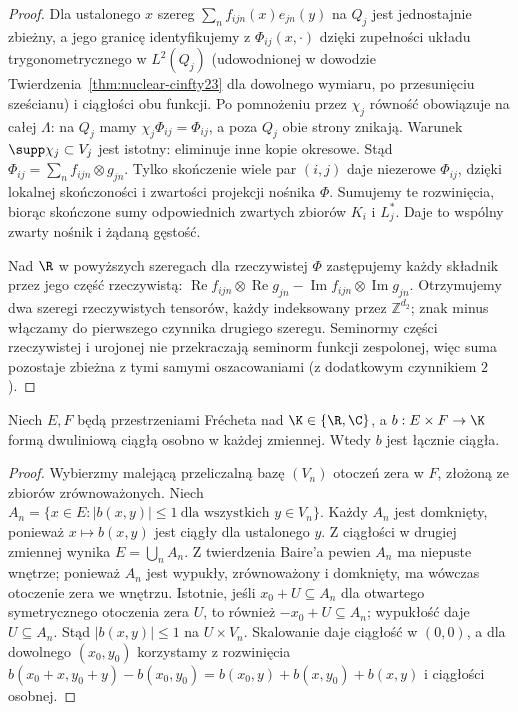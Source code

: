 \begin{proof}
Dla ustalonego $x$ szereg $\sum_n f_{ijn}(x)e_{jn}(y)$
na $Q_j$ jest jednostajnie zbieżny, a jego granicę
identyfikujemy z $\Phi_{ij}(x,\cdot)$ dzięki
zupełności układu trygonometrycznego w $L^2(Q_j)$
(udowodnionej w dowodzie Twierdzenia~\ref{thm:nuclear-cinfty23}
dla dowolnego wymiaru, po przesunięciu sześcianu)
i ciągłości obu funkcji. Po pomnożeniu przez $\chi_j$
równość obowiązuje na całej $\Lambda$: na $Q_j$
mamy $\chi_j\Phi_{ij}=\Phi_{ij}$, a poza $Q_j$
obie strony znikają. Warunek $\supp\chi_j\subset V_j$
jest istotny: eliminuje inne kopie okresowe.
Stąd $\Phi_{ij}=\sum_n f_{ijn}\otimes g_{jn}$.
Tylko skończenie wiele par $(i,j)$ daje niezerowe
$\Phi_{ij}$, dzięki lokalnej skończoności i zwartości
projekcji nośnika $\Phi$. Sumujemy te rozwinięcia,
biorąc skończone sumy odpowiednich zwartych zbiorów
$K_i$ i $L_j^*$. Daje to wspólny zwarty nośnik
i żądaną gęstość.

Nad $\R$ w powyższych szeregach dla rzeczywistej $\Phi$
zastępujemy każdy składnik przez jego część rzeczywistą:
$\operatorname{Re}f_{ijn}\otimes\operatorname{Re}g_{jn}
-\operatorname{Im}f_{ijn}\otimes\operatorname{Im}g_{jn}$.
Otrzymujemy dwa szeregi rzeczywistych tensorów,
każdy indeksowany przez $\mathbb Z^{d_2}$; znak minus
włączamy do pierwszego czynnika drugiego szeregu.
Seminormy części rzeczywistej i urojonej nie przekraczają
seminorm funkcji zespolonej, więc suma pozostaje
zbieżna z tymi samymi oszacowaniami
(z dodatkowym czynnikiem $2$).
\end{proof}

\begin{lemat}
\label{lem:separate-joint23}
Niech $E,F$ będą przestrzeniami Frécheta nad
$\K\in\{\R,\C\}$, a $b:E\times F\to\K$
formą dwuliniową ciągłą osobno w każdej zmiennej.
Wtedy $b$ jest łącznie ciągła.
\end{lemat}
\begin{proof}
Wybierzmy malejącą przeliczalną bazę
$(V_n)$ otoczeń zera w $F$, złożoną ze zbiorów
zrównoważonych. Niech
$A_n=\{x\in E: |b(x,y)|\le1\ \text{dla wszystkich }y\in V_n\}$.
Każdy $A_n$ jest domknięty, ponieważ $x\mapsto b(x,y)$
jest ciągły dla ustalonego $y$. Z ciągłości w drugiej
zmiennej wynika $E=\bigcup_n A_n$.
Z twierdzenia Baire'a pewien $A_n$ ma niepuste wnętrze;
ponieważ $A_n$ jest wypukły, zrównoważony i domknięty,
ma wówczas otoczenie zera we wnętrzu. Istotnie,
jeśli $x_0+U\subseteq A_n$ dla otwartego symetrycznego
otoczenia zera $U$, to również $-x_0+U\subseteq A_n$;
wypukłość daje $U\subseteq A_n$.
Stąd $|b(x,y)|\le1$ na $U\times V_n$.
Skalowanie daje ciągłość w $(0,0)$, a dla
dowolnego $(x_0,y_0)$ korzystamy z rozwinięcia
$b(x_0+x,y_0+y)-b(x_0,y_0)
=b(x_0,y)+b(x,y_0)+b(x,y)$ i ciągłości osobnej.
\end{proof}

